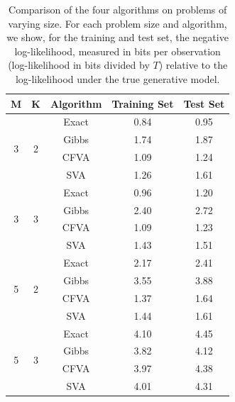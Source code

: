 \documentclass{article}
\begin{document}
\begin{table}
\centering
\begin{tabular}{cclll}
\hline
\ttfamily M & \ttfamily K & \ttfamily Algorithm & \ttfamily Training Set & \ttfamily Test Set \\
\hline
\multirow{4}{*}{3}  & \multirow{4}{*}{2} 
& \multicolumn{1}{c}{Exact} & \multicolumn{1}{c}{0.84}  & \multicolumn{1}{c}{0.95}
\\ \cline{3-5}
&	 & \multicolumn{1}{c}{Gibbs} & \multicolumn{1}{c}{1.74} & \multicolumn{1}{c}{1.87}
\\ \cline{3-5}
&   & \multicolumn{1}{c}{CFVA} & \multicolumn{1}{c}{1.09} & \multicolumn{1}{c}{1.24} 
\\ \cline{3-5}
&    & \multicolumn{1}{c}{SVA} & \multicolumn{1}{c}{1.26} & \multicolumn{1}{c}{1.61} \\ 
\hline
  \multirow{4}{*}{3}  & \multirow{4}{*}{3} 
& \multicolumn{1}{c}{Exact} & \multicolumn{1}{c}{0.96}  & \multicolumn{1}{c}{1.20}
\\ \cline{3-5}
&	 & \multicolumn{1}{c}{Gibbs} & \multicolumn{1}{c}{2.40} & \multicolumn{1}{c}{2.72}
\\ \cline{3-5}
&   & \multicolumn{1}{c}{CFVA} & \multicolumn{1}{c}{1.09} & \multicolumn{1}{c}{1.23} 
\\ \cline{3-5}
&    & \multicolumn{1}{c}{SVA} & \multicolumn{1}{c}{1.43} & \multicolumn{1}{c}{1.51} \\ 
\hline
\multirow{4}{*}{5}  & \multirow{4}{*}{2} 
& \multicolumn{1}{c}{Exact} & \multicolumn{1}{c}{2.17}  & \multicolumn{1}{c}{2.41}
\\ \cline{3-5}
&	 & \multicolumn{1}{c}{Gibbs} & \multicolumn{1}{c}{3.55} & \multicolumn{1}{c}{3.88}
\\ \cline{3-5}
&   & \multicolumn{1}{c}{CFVA} & \multicolumn{1}{c}{1.37} & \multicolumn{1}{c}{1.64} 
\\ \cline{3-5}
&    & \multicolumn{1}{c}{SVA} & \multicolumn{1}{c}{1.44} & \multicolumn{1}{c}{1.61} \\ 
\hline
\multirow{4}{*}{5}  & \multirow{4}{*}{3} 
& \multicolumn{1}{c}{Exact} & \multicolumn{1}{c}{4.10}  & \multicolumn{1}{c}{4.45}
\\ \cline{3-5}
&	 & \multicolumn{1}{c}{Gibbs} & \multicolumn{1}{c}{3.82} & \multicolumn{1}{c}{4.12}
\\ \cline{3-5}
&   & \multicolumn{1}{c}{CFVA} & \multicolumn{1}{c}{3.97} & \multicolumn{1}{c}{4.38} 
\\ \cline{3-5}
&    & \multicolumn{1}{c}{SVA} & \multicolumn{1}{c}{4.01} & \multicolumn{1}{c}{4.31} \\  
\hline 
\end{tabular}
\caption{Comparison of the four algorithms on problems of varying size. For each problem size and algorithm, we show, for the training and test set, the negative log-likelihood, measured in bits per observation (log-likelihood in bits divided by $T$) relative to the log-likelihood under the true generative model.}
\label{tab1}
\end{table}
\end{document}
